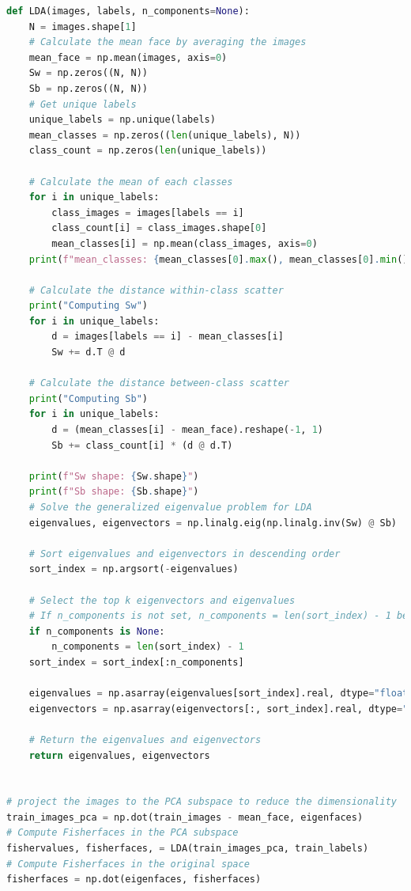 \documentclass{homework}
\begin{document}
\begin{lstlisting}[language=Python]
def LDA(images, labels, n_components=None):
    N = images.shape[1]
    # Calculate the mean face by averaging the images
    mean_face = np.mean(images, axis=0)
    Sw = np.zeros((N, N))
    Sb = np.zeros((N, N))
    # Get unique labels
    unique_labels = np.unique(labels)
    mean_classes = np.zeros((len(unique_labels), N))
    class_count = np.zeros(len(unique_labels))

    # Calculate the mean of each classes
    for i in unique_labels:
        class_images = images[labels == i]
        class_count[i] = class_images.shape[0]
        mean_classes[i] = np.mean(class_images, axis=0)
    print(f"mean_classes: {mean_classes[0].max(), mean_classes[0].min()}")

    # Calculate the distance within-class scatter
    print("Computing Sw")
    for i in unique_labels:
        d = images[labels == i] - mean_classes[i]
        Sw += d.T @ d

    # Calculate the distance between-class scatter
    print("Computing Sb")
    for i in unique_labels:
        d = (mean_classes[i] - mean_face).reshape(-1, 1)
        Sb += class_count[i] * (d @ d.T)

    print(f"Sw shape: {Sw.shape}")
    print(f"Sb shape: {Sb.shape}")
    # Solve the generalized eigenvalue problem for LDA
    eigenvalues, eigenvectors = np.linalg.eig(np.linalg.inv(Sw) @ Sb)

    # Sort eigenvalues and eigenvectors in descending order
    sort_index = np.argsort(-eigenvalues)

    # Select the top k eigenvectors and eigenvalues
    # If n_components is not set, n_components = len(sort_index) - 1 because the last eigenvector is 0
    if n_components is None:
        n_components = len(sort_index) - 1
    sort_index = sort_index[:n_components]

    eigenvalues = np.asarray(eigenvalues[sort_index].real, dtype="float")
    eigenvectors = np.asarray(eigenvectors[:, sort_index].real, dtype="float")

    # Return the eigenvalues and eigenvectors
    return eigenvalues, eigenvectors


# project the images to the PCA subspace to reduce the dimensionality
train_images_pca = np.dot(train_images - mean_face, eigenfaces)
# Compute Fisherfaces in the PCA subspace
fishervalues, fisherfaces, = LDA(train_images_pca, train_labels)
# Compute Fisherfaces in the original space
fisherfaces = np.dot(eigenfaces, fisherfaces)
\end{lstlisting}
\end{document}
